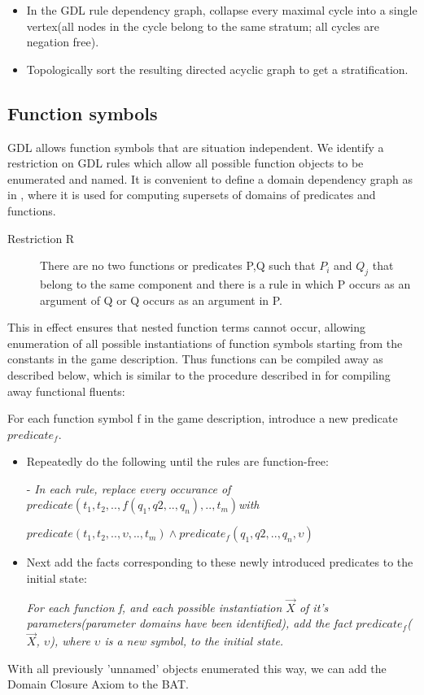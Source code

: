 \documentclass{article}
\begin{document}
\begin{itemize}
\item In the GDL rule dependency graph, collapse every maximal cycle into a single vertex(all nodes in the
cycle belong to the same stratum; all cycles are negation free).
\item Topologically sort the resulting directed acyclic graph to get a stratification. 
\end{itemize}

\subsection{Function symbols}

GDL allows function symbols that are situation independent. We identify a restriction on GDL rules which allow all possible function objects to be enumerated and named. It is convenient to define a domain dependency graph as in \cite{fluxplayer:aaai07}, where it is used for computing supersets of domains of predicates and functions.

\begin{description}
\item [{Restriction R}]
There are no two functions or predicates P,Q such that $P_{i}$ and $Q_{j}$ that belong to the same component and there is a rule in which P occurs as an argument of Q or Q occurs as an argument in P.
\end{description}

This in effect ensures that nested function terms cannot occur, allowing enumeration of all possible instantiations of function symbols starting from the constants in the game description. Thus functions can be compiled away as described below, which is similar to the procedure described in \cite{roeger:aaai} for compiling away functional fluents:

For each function symbol f in the game description, introduce a new
predicate $predicate_{f}$.

\begin{itemize}
\item Repeatedly do the following until the rules are function-free:

- \emph{In each rule, replace every occurance of $predicate(t_{1},t_{2},..,f(q_{1},q{2},..,q_{n}),..,t_{m})$with }

\emph{$predicate(t_{1},t_{2},..,\upsilon,..,t_{m}) \land  predicate_{f}(q_{1},q{2},..,q_{n},\upsilon)$}

\item Next add the facts corresponding to these newly introduced predicates to the initial state:

\emph{For each function f, and each possible instantiation $\vec{X}$
of it's parameters(parameter domains have been identified), add the
fact $predicate_{f}$($\vec{X}$, $\upsilon$), where $\upsilon$
is a new symbol, to the initial state.}

\end{itemize}
With all previously 'unnamed' objects enumerated this way, we can
add the Domain Closure Axiom to the BAT.
\end{document}
